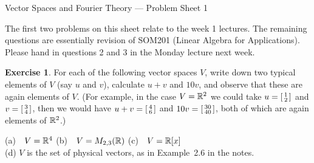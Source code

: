 \documentclass[a4paper]{amsart}
\theoremstyle{definition}
\newenvironment{rubric}{}{}
\newtheorem{exercise}{Exercise}
\begin{document}

\begin{center}
 {\huge Vector Spaces and Fourier Theory ---
   Problem Sheet 1
 }
\end{center}

\begin{rubric}
The first two problems on this sheet relate to the week 1
lectures.  The remaining questions are essentially revision
of SOM201 (Linear Algebra for Applications).  Please hand in
questions 2 and 3 in the Monday lecture next week.
\end{rubric}

\begin{exercise}\label{ex-typical-elements}
 For each of the following vector spaces $V$, write down two
 typical elements of $V$ (say $u$ and $v$), calculate $u+v$
 and $10v$, and observe that these are again elements of
 $V$.  (For example, in the case $V={\mathbb{R}}^2$ we could take
 $u=\left[\begin{smallmatrix} 1\\2\end{smallmatrix}\right]$ and $v=\left[\begin{smallmatrix} 3\\4\end{smallmatrix}\right]$, then we would have
 $u+v=\left[\begin{smallmatrix} 4\\6\end{smallmatrix}\right]$ and $10v=\left[\begin{smallmatrix} 30\\40\end{smallmatrix}\right]$, both of
 which are again elements of ${\mathbb{R}}^2$.)
 \begin{center}
  (a)~~$V={\mathbb{R}}^4$  \hspace{3em}
  (b)~~$V=M_{2,3}({\mathbb{R}})$ \hspace{3em}
  (c)~~$V={\mathbb{R}}[x]$ \\
  (d) $V$ is the set of physical vectors, as in
   Example~2.6 in the notes.
 \end{center}
\end{exercise}
\end{document}
